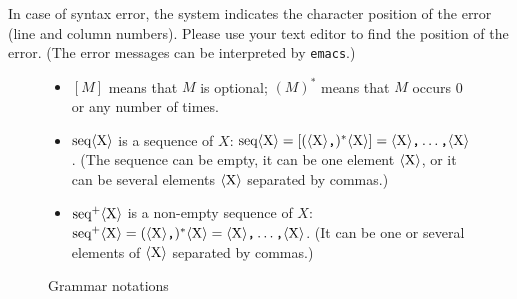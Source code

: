 In case of syntax error, the system indicates the character position
of the error (line and column numbers). Please use your text editor to
find the position of the error. (The error messages can be interpreted
by \texttt{emacs}.)

\begin{figure}
\begin{itemize}

\item $[M]$ means that $M$ is optional; $(M)^*$ means that $M$ occurs 0 or
any number of times.

\item
$\textrm{seq}\langle\textrm{X}\rangle$ is a sequence of $X$: $\textrm{seq}\langle\textrm{X}\rangle = [(\langle\textrm{X}\rangle\texttt{,})^*\langle\textrm{X}\rangle] = \langle\textrm{X}\rangle\texttt{,}\ldots\texttt{,}\langle\textrm{X}\rangle$. (The sequence can be empty, it can be one element $\langle\textrm{X}\rangle$, or it can be several elements $\langle\textrm{X}\rangle$ separated by commas.)

\item
$\textrm{seq}^+\langle\textrm{X}\rangle$ is a non-empty sequence of $X$: $\textrm{seq}^+\langle\textrm{X}\rangle = (\langle\textrm{X}\rangle\texttt{,})^*\langle\textrm{X}\rangle = \langle\textrm{X}\rangle\texttt{,}\ldots\texttt{,}\langle\textrm{X}\rangle$.
(It can be one or several elements of $\langle\textrm{X}\rangle$ separated by commas.)

\end{itemize}
\caption{Grammar notations}
\label{fig:syntax0}
\end{figure}

